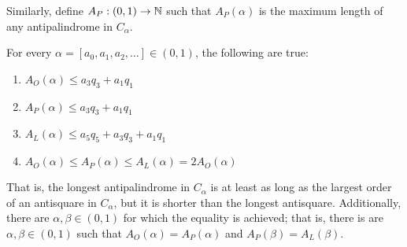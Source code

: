 Similarly, define $A_P : (0, 1) \to \mathbb{N}$ such that $A_P(\alpha)$ is the maximum length of any antipalindrome in $C_{\alpha}$.

\begin{theorem}
    For every $\alpha = [a_0, a_1, a_2, \ldots] \in (0,1)$, the following are true:
    \begin{enumerate}[label=(\roman*)]
        \item $A_O(\alpha) \leq a_3 q_3 + a_1 q_1$
        \item $A_P(\alpha) \leq a_3 q_3 + a_1 q_1$ 
        \item $A_L(\alpha) \leq a_5 q_5 + a_3 q_3 + a_1 q_1$
        \item $A_O(\alpha) \leq A_P(\alpha) \leq A_L(\alpha) = 2A_O(\alpha)$
    \end{enumerate}
    
    That is, the longest antipalindrome in $C_{\alpha}$ is at least as long as the largest order of an antisquare in $C_{\alpha}$, but it is shorter than the longest antisquare.
    Additionally, there are $\alpha, \beta \in (0, 1)$ for which the equality is achieved; that is, there is are $\alpha, \beta \in (0, 1)$ such that $A_O(\alpha) = A_P(\alpha)$ and $A_P(\beta) = A_L(\beta)$.
    
\end{theorem}
